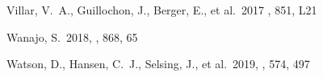 \documentclass[twocolumn,twocolappendix]{aastex63}
\begin{document}
\begin{thebibliography}{}
Villar, V.~A., Guillochon, J., Berger, E., et al.\ 2017 \aj, 851, L21












 Wanajo, S.\ 2018, \apj, 868, 65






 Watson, D., Hansen, C.~J., Selsing, J., et al.\ 2019, \nat, 574, 497


















\end{thebibliography}
\end{document}
